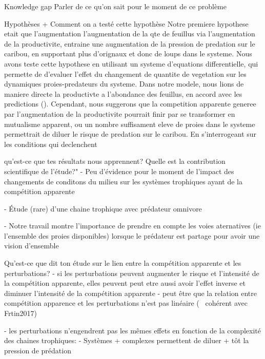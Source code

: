 Knowledge gap
Parler de ce qu'on sait pour le moment de ce problème \cite{chaguaceda2021}


Hypothèses + Comment on a testé cette hypothèse
Notre premiere hypothese etait que l'augmentation l'augmentation de la qte de feuillus via l'augmentation de la productivite, entraine une augmentation de la pression de predation sur le caribou, en supportant plus d'orignaux et donc de loups dans le systeme. Nous avons teste cette hypothese en utilisant un systeme d'equations differentielle, qui permette de d'evaluer l'effet du changement de quantite de vegetation sur les dynamiques proies-predateurs du systeme. Dans notre modele, nous lions de maniere directe la productivte a l'abondance des feuillus, en accord avec les predictions (\textcolor{trouver ref}). Cependant, nous suggerons que la competition apparente generee par l'augmentation de la productivite pourrait finir par se transformer en mutualisme apparent, ou un nombre suffisament eleve de proies dans le systeme permettrait de diluer le risque de predation sur le caribou. En s'interrogeant sur les conditions qui declenchent 

qu'est-ce que tes résultats nous apprennent? Quelle est la contribution scientifique de l'étude?" 
- Peu d'évidence pour le moment de l'impact des changements de conditons du milieu sur les systèmes trophiques ayant de la compétition apparente \cite{chaguaceda2021}

- Étude (rare) d'une chaine trophique avec prédateur omnivore \cite{chaguaceda2021}

- Notre travail montre l'importance de prendre en compte les voies aternatives (ie l'ensemble des proies disponibles) lorsque le prédateur est partage pour avoir une vision d'ensemble



Qu'est-ce que dit ton étude sur le lien entre la compétition apparente et les perturbations?
- si les perturbations peuvent augmenter le risque et l'intensité de la compétition apparente, elles peuvent peut etre aussi avoir l'effet inverse et diminuer l'intensité de la compétition apparente
- peut être que la relation entre compétition apparence et les perturbations n'est pas linéaire (~ cohérent avec Frtin2017)

- les perturbations n'engendrent pas les mêmes effets en fonction de la complexité des chaines trophiques:
	- Systèmes + complexes permettent de diluer + tôt la pression de prédation 